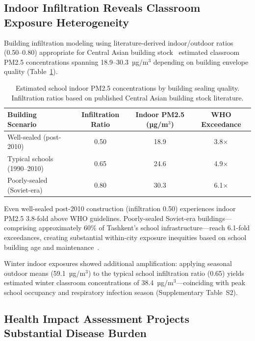 \documentclass[11pt,a4paper]{article}
\begin{document}
\subsection{Indoor Infiltration Reveals Classroom Exposure Heterogeneity}

Building infiltration modeling using literature-derived indoor/outdoor ratios (0.50--0.80) appropriate for Central Asian building stock~\cite{abt2000relative,macintosh2009residential,chen2012review} estimated classroom PM2.5 concentrations spanning 18.9--30.3~µg/m$^3$ depending on building envelope quality (Table~\ref{tab:infiltration}).

\begin{table}[H]
\centering
\caption{Estimated school indoor PM2.5 concentrations by building sealing quality. Infiltration ratios based on published Central Asian building stock literature.}
\label{tab:infiltration}
\begin{tabular}{lccc}
\toprule
Building Scenario & Infiltration Ratio & Indoor PM2.5 (µg/m$^3$) & WHO Exceedance \\
\midrule
Well-sealed (post-2010) & 0.50 & 18.9 & 3.8$\times$ \\
Typical schools (1990--2010) & 0.65 & 24.6 & 4.9$\times$ \\
Poorly-sealed (Soviet-era) & 0.80 & 30.3 & 6.1$\times$ \\
\bottomrule
\end{tabular}
\end{table}

Even well-sealed post-2010 construction (infiltration 0.50) experiences indoor PM2.5 3.8-fold above WHO guidelines. Poorly-sealed Soviet-era buildings---comprising approximately 60\% of Tashkent's school infrastructure---reach 6.1-fold exceedances, creating substantial within-city exposure inequities based on school building age and maintenance~\cite{fisk2017association,allen2016associations}.

Winter indoor exposures showed additional amplification: applying seasonal outdoor means (59.1~µg/m$^3$) to the typical school infiltration ratio (0.65) yields estimated winter classroom concentrations of 38.4~µg/m$^3$---coinciding with peak school occupancy and respiratory infection season (Supplementary Table~S2).

\subsection{Health Impact Assessment Projects Substantial Disease Burden}
\end{document}
